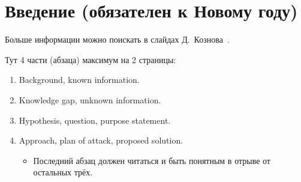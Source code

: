 
\section*{Введение (обязателен к Новому году)}
\thispagestyle{withCompileDate}
Больше информации можно поискать в слайдах Д.~Кознова~\cite{koznov}.

Тут  4 части (абзаца) максимум на 2 страницы:
\begin{enumerate}
\item Background, known information.
\item Knowledge gap, unknown information.
\item  Hypothesis, question, purpose statement.
\item Approach, plan of attack, proposed solution.
\begin{itemize}
\item Последний абзац должен читаться и быть понятным в отрыве от остальных трёх.
\end{itemize}
\end{enumerate}




